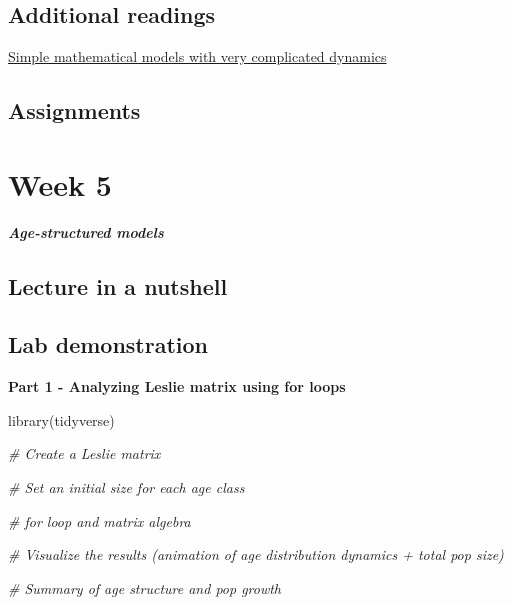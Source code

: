 \documentclass[
]{book}
\newenvironment{Shaded}{\begin{snugshade}}{\end{snugshade}}
\newcommand{\CommentTok}[1]{\textcolor[rgb]{0.56,0.35,0.01}{\textit{#1}}}
\newcommand{\FunctionTok}[1]{\textcolor[rgb]{0.00,0.00,0.00}{#1}}
\newcommand{\NormalTok}[1]{#1}
\begin{document}
\hypertarget{additional-readings-3}{%
\section*{Additional readings}\label{additional-readings-3}}

\href{./Additional\%20readings/May_1976_Nature.pdf}{Simple mathematical models with very complicated dynamics}

\hypertarget{assignments-3}{%
\section*{Assignments}\label{assignments-3}}

\hypertarget{week-5}{%
\chapter*{Week 5}\label{week-5}}

\textbf{\emph{Age-structured models}}

\hypertarget{lecture-in-a-nutshell-4}{%
\section*{Lecture in a nutshell}\label{lecture-in-a-nutshell-4}}

\hypertarget{lab-demonstration-4}{%
\section*{Lab demonstration}\label{lab-demonstration-4}}

\textbf{Part 1 - Analyzing Leslie matrix using for loops}

\begin{Shaded}
\begin{Highlighting}[]
\FunctionTok{library}\NormalTok{(tidyverse)}

\CommentTok{\# Create a Leslie matrix}

\CommentTok{\# Set an initial size for each age class}

\CommentTok{\# for loop and matrix algebra}

\CommentTok{\# Visualize the results (animation of age distribution dynamics + total pop size)}

\CommentTok{\# Summary of age structure and pop growth}
\end{Highlighting}
\end{Shaded}
\end{document}
